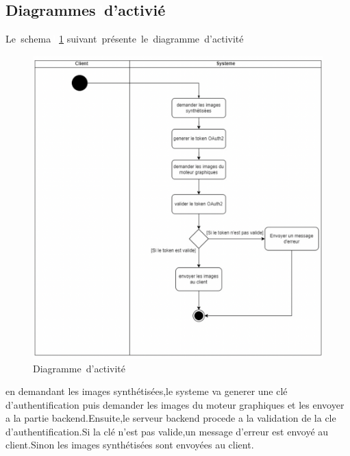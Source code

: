 \subsection{Diagrammes\textcolor{white}{J}d’activié}
Le\textcolor{white}{J}schema\textcolor{white}{J}  \ref{fig:digAct4} suivant\textcolor{white}{J}présente\textcolor{white}{J}le\textcolor{white}{J}diagramme\textcolor{white}{J}d’activité
\begin{figure}[!ht]\centering
\includegraphics[width=1\textwidth,angle=00]{chapitres/chapitre4/figures/Act-Chap4.png}
\caption{Diagramme\textcolor{white}{J}d’activité}
\label{fig:digAct4}
\end{figure}

en demandant les images synthétisées,le systeme va generer une  clé d'authentification puis demander les images du moteur graphiques et les envoyer a la partie backend.Ensuite,le serveur backend procede a la validation de la cle d'authentification.Si la clé n'est pas valide,un message d'erreur est envoyé au client.Sinon les images synthétisées sont envoyées au client.

\newpage
